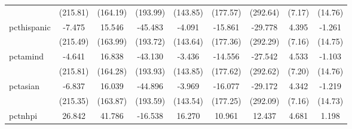 {\begin{tabular}{l*{8}{c}}
            &                 (215.81)         &                 (164.19)         &                 (193.99)         &                 (143.85)         &                 (177.57)         &                 (292.64)         &                   (7.17)         &                  (14.76)         \\
pcthispanic &                   -7.475         &                   15.546         &                  -45.483         &                   -4.091         &                  -15.861         &                  -29.778         &                    4.395         &                   -1.261         \\
            &                 (215.49)         &                 (163.99)         &                 (193.72)         &                 (143.64)         &                 (177.36)         &                 (292.29)         &                   (7.16)         &                  (14.75)         \\
pctamind    &                   -4.641         &                   16.838         &                  -43.130         &                   -3.436         &                  -14.556         &                  -27.542         &                    4.533         &                   -1.103         \\
            &                 (215.81)         &                 (164.28)         &                 (193.93)         &                 (143.85)         &                 (177.62)         &                 (292.62)         &                   (7.20)         &                  (14.76)         \\
pctasian    &                   -6.837         &                   16.039         &                  -44.896         &                   -3.969         &                  -16.077         &                  -29.172         &                    4.342         &                   -1.219         \\
            &                 (215.35)         &                 (163.87)         &                 (193.59)         &                 (143.54)         &                 (177.25)         &                 (292.09)         &                   (7.16)         &                  (14.73)         \\
pctnhpi     &                   26.842         &                   41.786         &                  -16.538         &                   16.270         &                   10.961         &                   12.437         &                    4.681         &                    1.198         \\

\end{tabular}}
